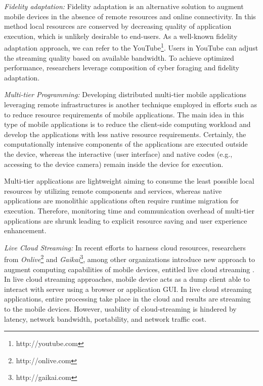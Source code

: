 \documentclass[publish]{IEEEtran}
\begin{document}
\textbullet\textit{ Fidelity adaptation:} Fidelity adaptation is an alternative solution to augment mobile devices in the absence of remote resources and online connectivity. In this method local resources are conserved by decreasing quality of application execution, which is unlikely desirable to end-users. As a well-known fidelity adaptation approach, we can refer to the YouTube\footnote{http://youtube.com}. Users in YouTube can adjust the streaming quality based on available bandwidth. To achieve optimized performance, researchers \cite{Flinna,Lara} leverage composition of cyber foraging and fidelity adaptation. 

\textbullet\textit{ Multi-tier Programming:} Developing distributed multi-tier mobile applications leveraging remote infrastructures is another technique employed in efforts such as \cite{SAMI, MOMCC, March2011,Christensen2009} to reduce resource requirements of mobile applications. The main idea in this type of mobile applications is to reduce the client-side computing workload and develop the applications with less native resource requirements. Certainly, the computationally intensive components of the applications are executed outside the device, whereas the interactive (user interface) and native codes (e.g., accessing to the device camera) remain inside the device for execution. 

Multi-tier applications are lightweight aiming to consume the least possible local resources by utilizing remote components and services, whereas native applications are monolithic applications often require runtime migration for execution. Therefore, monitoring time and communication overhead of multi-tier applications are shrunk leading to explicit resource saving and user experience enhancement. 

\textbullet\textit{ Live Cloud Streaming:} \label{cloud-streaming}
 In recent efforts to harness cloud resources, researchers from \textit{Onlive}\footnote{http://onlive.com} and \textit{Gaikai}\footnote{http://gaikai.com}, among other organizations introduce new approach to augment computing capabilities of mobile devices, entitled live cloud streaming \cite{Lawton2012}. In live cloud streaming approaches, mobile device acts as a dump client able to interact with server using a browser or application GUI. In live cloud streaming applications, entire processing take place in the cloud and results are streaming to the mobile devices. However, usability of cloud-streaming is hindered by latency, network bandwidth, portability, and network traffic cost. 
\end{document}
